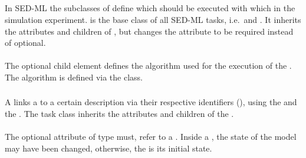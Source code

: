 \subsection{}
\label{class:abstractTask}
In SED-ML the subclasses of  define which \Simulations should be executed with which \Models in the simulation experiment.  is the base class of all SED-ML tasks, i.e.\ \Task and \RepeatedTask.  It inherits the attributes and children of \SedBase, but changes the  attribute to be required instead of optional.


\begin{blockChanged}
\paragraph*{}
\label{sec:task-algorithm}
The optional child  element defines the algorithm used for the execution of the \AbstractTask. The algorithm is defined via the \Algorithm class.
\end{blockChanged}



\subsubsection{}
\label{class:task}

A  links a \Model to a certain \Simulation description via their respective identifiers (), using the \hyperref[sec:modelReference]{} and the \hyperref[sec:simulationReference]{}. The task class inherits the attributes and children of the \AbstractTask.

\paragraph*{}
The optional  attribute of type \SIdRef must,  refer to a \Model.  Inside a \RepeatedTask, the state of the model may have been changed, otherwise, the \Model is  its initial state.   

